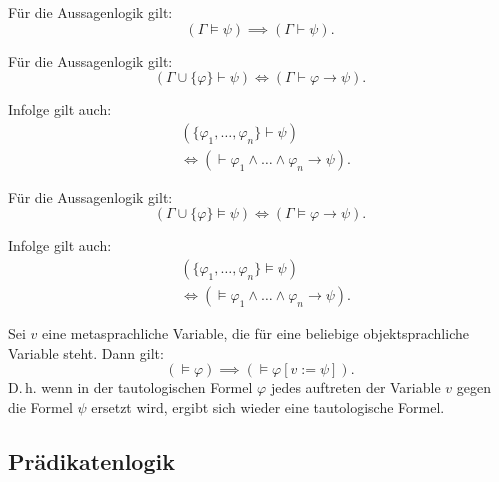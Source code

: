 Für die Aussagenlogik gilt:
\begin{equation}
(\Gamma\models\psi)\implies (\Gamma\vdash\psi).
\end{equation}

\noindent
{}

Für die Aussagenlogik gilt:
\begin{equation}
(\Gamma\cup\{\varphi\}\vdash\psi)\iff (\Gamma\vdash\varphi\rightarrow\psi).
\end{equation}

Infolge gilt auch:
\begin{equation}
\begin{split}
&(\{\varphi_1,\ldots,\varphi_n\}\vdash\psi)\\
&\iff (\vdash \varphi_1\land\ldots\land\varphi_n\rightarrow\psi).
\end{split}
\end{equation}

\noindent
{}

Für die Aussagenlogik gilt:
\begin{equation}
(\Gamma\cup\{\varphi\}\models\psi)\iff (\Gamma\models\varphi\rightarrow\psi).
\end{equation}

Infolge gilt auch:
\begin{equation}
\begin{split}
&(\{\varphi_1,\ldots,\varphi_n\}\models\psi)\\
&\iff (\models \varphi_1\land\ldots\land\varphi_n\rightarrow\psi).
\end{split}
\end{equation}

\noindent
{}

Sei $v$ eine metasprachliche Variable, die für eine beliebige
objektsprachliche Variable steht. Dann gilt:
\begin{equation}
(\models\varphi) \implies (\models\varphi[v:=\psi]).
\end{equation}
D.\,h. wenn in der tautologischen Formel $\varphi$ jedes auftreten
der Variable $v$ gegen die Formel $\psi$ ersetzt wird, ergibt
sich wieder eine tautologische Formel.

\subsection{Prädikatenlogik}
